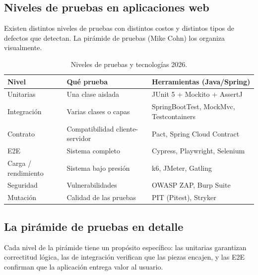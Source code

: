 \documentclass[11pt,a4paper,openany]{book}
\begin{document}
\subsection{Niveles de pruebas en aplicaciones web}

Existen distintos niveles de pruebas con distintos costos y
distintos tipos de defectos que detectan. La pirámide de pruebas
(Mike Cohn) los organiza visualmente.


\begin{table}[htbp]
\centering
\caption{Niveles de pruebas y tecnologías 2026.}
\footnotesize
\begin{tabularx}{\textwidth}{lXX}
\toprule
\textbf{Nivel} & \textbf{Qué prueba} & \textbf{Herramientas (Java/Spring)}\\
\midrule
Unitarias    & Una clase aislada & JUnit 5 + Mockito + AssertJ\\
Integración  & Varias clases o capas & SpringBootTest, MockMvc, Testcontainers\\
Contrato     & Compatibilidad cliente-servidor & Pact, Spring Cloud Contract\\
E2E          & Sistema completo & Cypress, Playwright, Selenium\\
Carga / rendimiento & Sistema bajo presión & k6, JMeter, Gatling\\
Seguridad    & Vulnerabilidades & OWASP ZAP, Burp Suite\\
Mutación     & Calidad de las pruebas & PIT (Pitest), Stryker\\
\bottomrule
\end{tabularx}
\end{table}

\subsection{La pirámide de pruebas en detalle}

Cada nivel de la pirámide tiene un propósito específico:
las unitarias garantizan correctitud lógica, las de integración
verifican que las piezas encajen, y las E2E confirman que la
aplicación entrega valor al usuario.
\end{document}
